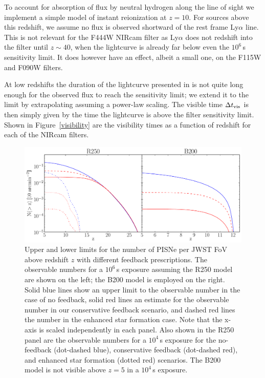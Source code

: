 \documentclass{thesis}
\newcommand{\RefFig}[1]{\mbox{Figure~\ref{#1}}}
\begin{document}
To account for absorption of flux by neutral hydrogen along the line
of sight we implement a simple model of instant reionization at
$z=10$.  For sources above this redshift, we assume no flux is
observed shortward of the rest frame Ly$\alpha$ line.  This is not
relevant for the F444W NIRcam filter as Ly$\alpha$ does not redshift
into the filter until $z\sim40$, when the lightcurve is already far
below even the $10^6\,$s sensitivity limit.  It does however have an
effect, albeit a small one, on the F115W and F090W filters.

At low redshifts the duration of the lightcurve presented in
\citet{KasenWoosleyHeger2011} is not quite long enough for the
observed flux to reach the sensitivity limit; we extend it to the
limit by extrapolating assuming a power-law scaling.  The visible time
$\Delta t_{\rm vis}$ is then simply given by the time the lightcurve
is above the filter sensitivity limit.  Shown in \RefFig{visibility}
are the visibility times as a function of redshift for each of the
NIRcam filters.  

\begin{figure}[ht!]
 \begin{center}
   \includegraphics[width=13cm]{observableNumber}
   \caption{\footnotesize Upper and lower limits for the number of
     PISNe per JWST FoV above redshift $z$ with different feedback
     prescriptions. The observable numbers for a $10^6\,$s exposure
     assuming the R250 model are shown on the left; the B200 model is
     employed on the right. Solid blue lines show an upper limit to
     the observable number in the case of no feedback, solid red lines
     an estimate for the observable number in our conservative
     feedback scenario, and dashed red lines the number in the
     enhanced star formation case. Note that the x-axis is scaled
     independently in each panel.  Also shown in the R250 panel are
     the observable numbers for a $10^4\,$s exposure for the
     no-feedback (dot-dashed blue), conservative feedback (dot-dashed
     red), and enhanced star formation (dotted red) scenarios. The
     B200 model is not visible above $z=5$ in a $10^4\,$s exposure.}
   \label{obsnumber}
 \end{center}
\end{figure} 
\end{document}
